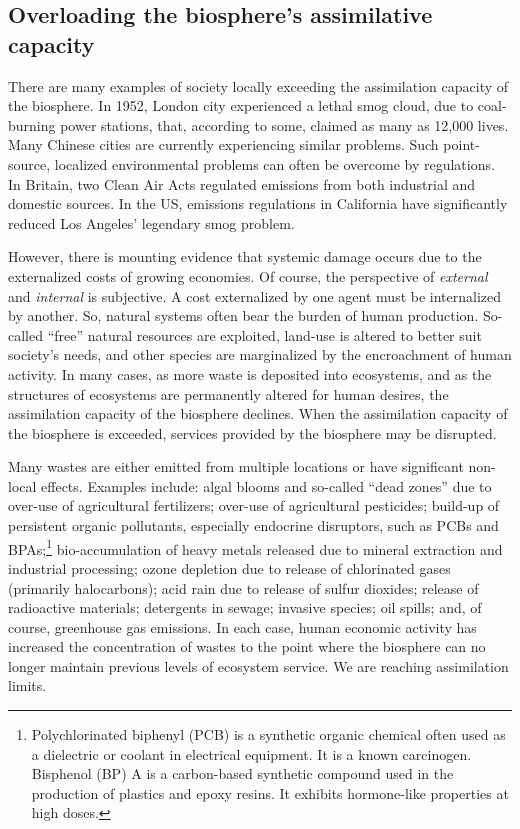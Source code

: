 \subsection{Overloading the biosphere's assimilative capacity}


There are many examples of society locally exceeding 
the assimilation capacity of the biosphere.
In 1952, London city experienced a lethal smog cloud,
due to coal-burning power stations,
that, according to some, 
claimed as many as 12,000 lives.\cite{Davis2002,Bell2004}
Many Chinese cities are currently experiencing similar problems.
Such point-source, localized environmental problems can often be overcome
by regulations.
In Britain, two Clean Air Acts regulated emissions from both
industrial and domestic sources.\cite{Brimblecombe2006}	
In the US, emissions regulations in California have 
significantly reduced Los Angeles' legendary smog problem.

However, there is mounting evidence that systemic
damage occurs due to the externalized costs
of growing economies.
Of course, the perspective of \emph{external} and \emph{internal} is subjective.
A cost externalized by one agent
must be internalized by another.\cite{MEA2005,Ewing2008}
So, natural systems often bear the burden of human production.
So-called ``free'' natural resources are exploited,
land-use is altered to better suit society's needs,
and other species are marginalized by the encroachment of human activity.\cite{schnaiberg1980}
In many cases, as more waste is deposited into ecosystems,
and as the structures of ecosystems are permanently altered for human desires,
the assimilation capacity of the biosphere declines.
When the assimilation capacity of the biosphere is exceeded, 
services provided by the biosphere may be disrupted.\cite{UNMEA2005}

Many wastes are either emitted from multiple locations or have 
significant non-local effects. 
Examples include:
algal blooms and so-called ``dead zones'' due to over-use of agricultural fertilizers;
over-use of agricultural pesticides;
build-up of persistent organic pollutants, especially endocrine disruptors, such as PCBs 
	and BPAs;\footnote{Polychlorinated biphenyl (PCB) 
		is a synthetic organic chemical often used as 
		a dielectric or coolant in electrical equipment.
		It is a known carcinogen.
		Bisphenol (BP) A is a carbon-based synthetic compound used in the production
		of plastics and epoxy resins. It exhibits hormone-like properties at high doses.
		}
bio-accumulation of heavy metals released due to mineral extraction and industrial processing;
ozone depletion due to release of chlorinated gases (primarily halocarbons);
acid rain due to release of sulfur dioxides;
release of radioactive materials;
detergents in sewage;
invasive species;
oil spills;
and, of course, greenhouse gas emissions.\cite{UNMEA2005, Butler1978, Walker2012}
In each case, human economic activity has increased the concentration
of wastes to the point where the biosphere can no longer maintain 
previous levels of ecosystem service.
We are reaching assimilation limits.


